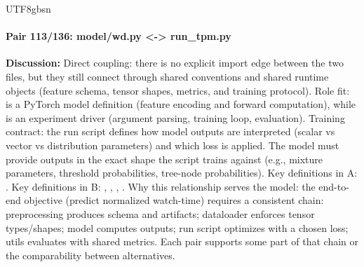 \documentclass[11pt]{article}
\begin{document}
\begin{CJK*}{UTF8}{gbsn}
\paragraph{Pair 113/136: model/wd.py <-> run\_tpm.py}
\textbf{Discussion:} Direct coupling: there is no explicit import edge between the two files, but they still connect through shared conventions and shared runtime objects (feature schema, tensor shapes, metrics, and training protocol). Role fit: \texttt{} is a PyTorch model definition (feature encoding and forward computation), while \texttt{} is an experiment driver (argument parsing, training loop, evaluation). Training contract: the run script defines how model outputs are interpreted (scalar vs vector vs distribution parameters) and which loss is applied. The model must provide outputs in the exact shape the script trains against (e.g., mixture parameters, threshold probabilities, tree-node probabilities). Key definitions in A: \texttt{}. Key definitions in B: \texttt{}, \texttt{}, \texttt{}, \texttt{}. Why this relationship serves the model: the end-to-end objective (predict normalized watch-time) requires a consistent chain: preprocessing produces schema and artifacts; dataloader enforces tensor types/shapes; model computes outputs; run script optimizes with a chosen loss; utils evaluates with shared metrics. Each pair supports some part of that chain or the comparability between alternatives.


\end{CJK*}
\end{document}
